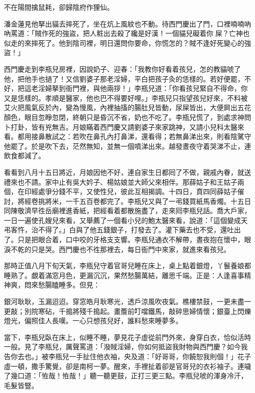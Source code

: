 \begin{myquote} 
不在陽間擒鼠耗，卻歸陰府作狸仙。
\end{myquote} 

潘金蓮見他拏出貓去摔死了，坐在炕上風紋也不動。待西門慶出了門，口裡喃喃吶吶罵道：「賊作死的強盜，把人粧出去殺了纔是好漢！一個貓兒礙着你𠳹屎？亡神也似走的來摔死了。他到陰司裡，明日還問你要命，你慌怎的？賊不逢好死變心的強盜！」{}

西門慶走到李瓶兒房裡，因說奶子、迎春：「我教你好看着孩兒，怎的教貓唬了他，把他手也撾了！又信劉婆子那老淫婦，平白把孩子灸的恁樣的。若好便罷，不好，把這老淫婦拏到衙門裡，與他兩拶！」李瓶兒道：「你看孩兒緊自不得命，你又是恁樣的。孝順是醫家，他也巴不得要好哩。」李瓶兒只指望孩兒好來，不料被艾火把風氣反於內，變為慢風，內裡抽搐的腸肚兒皆動，尿屎皆出，大便屙出五花顏色，眼目忽睜忽閉，終朝只是昏沉不省，奶也不吃了。李瓶兒慌了，到處求神問卜打卦，皆有兇無吉。月娘瞞着西門慶又請劉婆子來家跳神，又請小兒科太醫來看。都用接鼻散試之：若吹在鼻孔內打鼻涕，還看得；若無鼻涕出來，則看陰騭守他罷了。於是吹下去，茫然無知，並無一個噴涕出來。越發晝夜守着哭涕不止，連飲食都減了。

看看到八月十五日將近，月娘因他不好，連自家生日都囘了不做，親戚內眷，就送禮來也不請。家中止有吳大妗子、楊姑娘並大師父來相伴。那薛姑子和王姑子兩個，在印經處爭分錢不平，又使性兒，彼此互相揭調。十四日，賁四同薛姑子催討，將經卷挑將米，一千五百卷都完了。李瓶兒又與了一弔錢買紙馬香燭。十五日同陳敬濟早徃岳廟裡進香紙，把經看着都散施盡了，走來囘李瓶兒話。喬大戶家，一日一遍使孔嫂兒來看，又舉薦了一個看小兒的鮑太醫來看，說道：「這個變成天弔客忤，治不得了。」白與了他五錢銀子，打發去了。灌下藥去也不受，還吐出了。只是把眼合着，口中咬的牙格支支響。李瓶兒通衣不解帶，晝夜抱在懷中，眼淚不乾的只是哭。西門慶也不徃那裡去，每日衙門中來家，就進來看孩兒。

那時正值八月下旬天氣，李瓶兒守着官哥兒睡在床上，桌上點着銀燈，丫鬟養娘都睡熟了。覷着滿窓月色，更漏沉沉，果然愁腸萬結，離思千端。正是：人逢喜事精神爽，悶來愁腸瞌睡多。但見：

\begin{myquote} 
銀河耿耿，玉漏迢迢。穿窓皓月耿寒光，透戶涼風吹夜氣。樵樓禁鼓，一更未盡一更敲；別院寒砧，千搗將殘千搗起。畫簷前叮噹鐵馬，敲碎思婦情懷；銀臺上閃爍燈光，偏照佳人長嘆。一心只想孩兒好，誰料愁來睡夢多。
\end{myquote} 

當下，李瓶兒臥在床上，似睡不睡，夢見花子虛從前門外來，身穿白衣，恰似活時一般。見了李瓶兒，厲聲罵道：「潑賊淫婦，你如何抵盜我財物與西門慶？如今我告你去也。」被李瓶兒一手扯住他衣袖，央及道：「好哥哥，你饒恕我則個！」花子虛一頓，撒手驚覺，卻是南柯一夢。{}醒來，手裡扯着卻是官哥兒的衣衫袖子。連噦了幾口道：「恠哉！恠哉！」聽一聽更鼓，正打三更三點。李瓶兒唬的渾身冷汗，毛髮皆豎。

